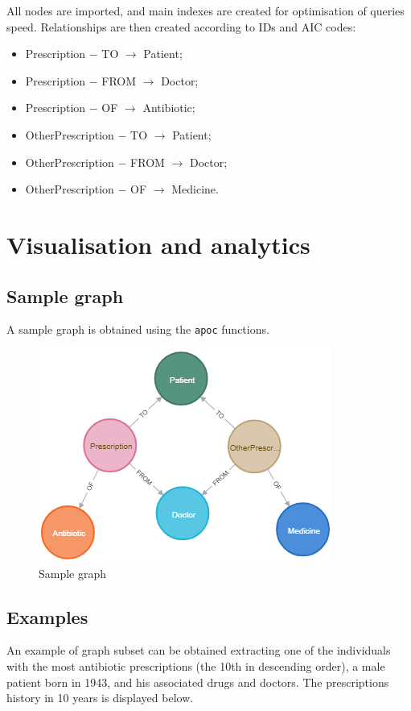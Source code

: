 All nodes are imported, and main indexes are created for optimisation of queries speed. Relationships are then created according to IDs and AIC codes:
\begin{itemize}
	\item Prescription $-$ TO $\rightarrow$ Patient;
	\item Prescription $-$ FROM $\rightarrow$ Doctor;
	\item Prescription $-$ OF $\rightarrow$ Antibiotic;
	\item OtherPrescription $-$ TO $\rightarrow$ Patient;
	\item OtherPrescription $-$ FROM $\rightarrow$ Doctor;
	\item OtherPrescription $-$ OF $\rightarrow$ Medicine.
\end{itemize}

\section{Visualisation and analytics}
\subsection{Sample graph}
A sample graph is obtained using the \texttt{apoc} functions.

\begin{figure}[h]
	\centering
	\includegraphics[scale=0.5]{./images/sample-graph.png}
	\caption{\small Sample graph}
\end{figure}

\subsection{Examples}
An example of graph subset can be obtained extracting one of the individuals with the most antibiotic prescriptions (the 10th in descending order), a male patient born in 1943, and his associated drugs and doctors. The prescriptions history in 10 years is displayed below.

